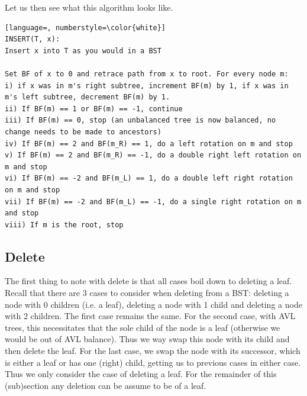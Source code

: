 
Let us then see what this algorithm looks like.

\begin{lstlisting}[language=, numberstyle=\color{white}]
INSERT(T, x):
Insert x into T as you would in a BST

Set BF of x to 0 and retrace path from x to root. For every node m:
i) if x was in m's right subtree, increment BF(m) by 1, if x was in m's left subtree, decrement BF(m) by 1.
ii) If BF(m) == 1 or BF(m) == -1, continue
iii) If BF(m) == 0, stop (an unbalanced tree is now balanced, no change needs to be made to ancestors)
iv) If BF(m) == 2 and BF(m_R) == 1, do a left rotation on m and stop
v) If BF(m) == 2 and BF(m_R) == -1, do a double right left rotation on m and stop
vi) If BF(m) == -2 and BF(m_L) == 1, do a double left right rotation on m and stop
vii) If BF(m) == -2 and BF(m_L) == -1, do a single right rotation on m and stop
viii) If m is the root, stop
\end{lstlisting}

\subsection{Delete}
The first thing to note with delete is that all cases boil down to deleting a leaf. Recall that there are 3 cases to consider when deleting from a BST: deleting a node with 0 children (i.e. a leaf), deleting a node with 1 child and deleting a node with 2 children. The first case remains the same. For the second case, with AVL trees, this necessitates that the sole child of the node is a leaf (otherwise we would be out of AVL balance). Thus we way swap this node with its child and then delete the leaf. For the last case, we swap the node with its successor, which is either a leaf or has one (right) child, getting us to previous cases in either case. Thus we only consider the case of deleting a leaf. For the remainder of this (sub)section any deletion can be assume to be of a leaf.

